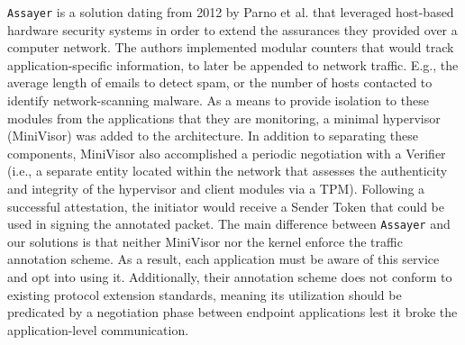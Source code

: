 \texttt{Assayer} \cite{parno2012using} is a solution dating from 2012 by Parno et al. that leveraged host-based hardware security systems in order to extend the assurances they provided over a computer network. The authors implemented modular counters that would track application-specific information, to later be appended to network traffic. E.g., the average length of emails to detect spam, or the number of hosts contacted to identify network-scanning malware. As a means to provide isolation to these modules from the applications that they are monitoring, a minimal hypervisor (MiniVisor) was added to the architecture. In addition to separating these components, MiniVisor also accomplished a periodic negotiation with a Verifier (i.e., a separate entity located within the network that assesses the authenticity and integrity of the hypervisor and client modules via a TPM). Following a successful attestation, the initiator would receive a Sender Token that could be used in signing the annotated packet. The main difference between \texttt{Assayer} and our solutions is that neither MiniVisor nor the kernel enforce the traffic annotation scheme. As a result, each application must be aware of this service and opt into using it. Additionally, their annotation scheme does not conform to existing protocol extension standards, meaning its utilization should be predicated by a negotiation phase between endpoint applications lest it broke the application-level communication.

